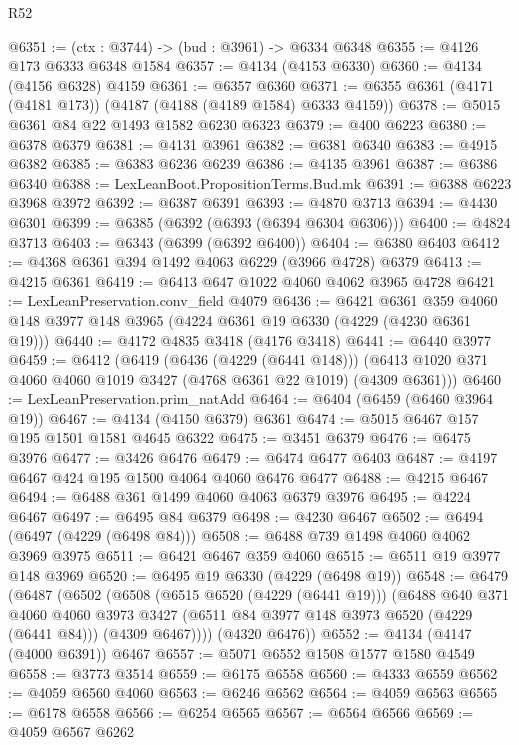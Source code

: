 \begin{lexlean}{R52}
\begin{coremodule}
@6351 := (ctx : @3744) -> (bud : @3961) -> @6334 @6348
@6355 := @4126 @173 @6333 @6348 @1584
@6357 := @4134 (@4153 @6330)
@6360 := @4134 (@4156 @6328) @4159
@6361 := @6357 @6360
@6371 := @6355 @6361 (@4171 (@4181 @173)) (@4187 (@4188 (@4189 @1584) @6333 @4159))
@6378 := @5015 @6361 @84 @22 @1493 @1582 @6230 @6323
@6379 := @400 @6223
@6380 := @6378 @6379
@6381 := @4131 @3961
@6382 := @6381 @6340
@6383 := @4915 @6382
@6385 := @6383 @6236 @6239
@6386 := @4135 @3961
@6387 := @6386 @6340
@6388 := LexLeanBoot.PropositionTerms.Bud.mk
@6391 := @6388 @6223 @3968 @3972
@6392 := @6387 @6391
@6393 := @4870 @3713
@6394 := @4430 @6301
@6399 := @6385 (@6392 (@6393 (@6394 @6304 @6306)))
@6400 := @4824 @3713
@6403 := @6343 (@6399 (@6392 @6400))
@6404 := @6380 @6403
@6412 := @4368 @6361 @394 @1492 @4063 @6229 (@3966 @4728) @6379
@6413 := @4215 @6361
@6419 := @6413 @647 @1022 @4060 @4062 @3965 @4728
@6421 := LexLeanPreservation.conv_field @4079
@6436 := @6421
    @6361
    @359
    @4060
    @148
    @3977
    @148
    @3965
    (@4224 @6361 @19 @6330 (@4229 (@4230 @6361 @19)))
@6440 := @4172 @4835 @3418 (@4176 @3418)
@6441 := @6440 @3977
@6459 := @6412
    (@6419
      (@6436 (@4229 (@6441 @148)))
      (@6413 @1020 @371 @4060 @4060 @1019 @3427 (@4768 @6361 @22 @1019) (@4309 @6361)))
@6460 := LexLeanPreservation.prim_natAdd
@6464 := @6404 (@6459 (@6460 @3964 @19))
@6467 := @4134 (@4150 @6379) @6361
@6474 := @5015 @6467 @157 @195 @1501 @1581 @4645 @6322
@6475 := @3451 @6379
@6476 := @6475 @3976
@6477 := @3426 @6476
@6479 := @6474 @6477 @6403
@6487 := @4197 @6467 @424 @195 @1500 @4064 @4060 @6476 @6477
@6488 := @4215 @6467
@6494 := @6488 @361 @1499 @4060 @4063 @6379 @3976
@6495 := @4224 @6467
@6497 := @6495 @84 @6379
@6498 := @4230 @6467
@6502 := @6494 (@6497 (@4229 (@6498 @84)))
@6508 := @6488 @739 @1498 @4060 @4062 @3969 @3975
@6511 := @6421 @6467 @359 @4060
@6515 := @6511 @19 @3977 @148 @3969
@6520 := @6495 @19 @6330 (@4229 (@6498 @19))
@6548 := @6479
    (@6487
      (@6502
        (@6508
          (@6515 @6520 (@4229 (@6441 @19)))
          (@6488
            @640
            @371
            @4060
            @4060
            @3973
            @3427
            (@6511 @84 @3977 @148 @3973 @6520 (@4229 (@6441 @84)))
            (@4309 @6467))))
      (@4320 @6476))
@6552 := @4134 (@4147 (@4000 @6391)) @6467
@6557 := @5071 @6552 @1508 @1577 @1580 @4549
@6558 := @3773 @3514
@6559 := @6175 @6558
@6560 := @4333 @6559
@6562 := @4059 @6560 @4060
@6563 := @6246 @6562
@6564 := @4059 @6563
@6565 := @6178 @6558
@6566 := @6254 @6565
@6567 := @6564 @6566
@6569 := @4059 @6567 @6262

\end{coremodule}
\end{lexlean}
